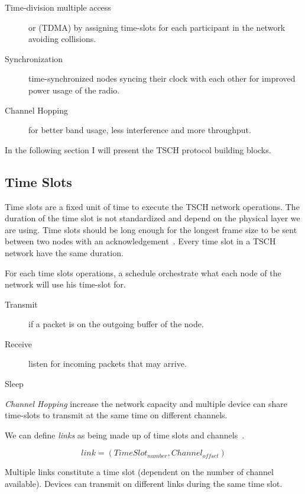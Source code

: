 \begin{description}
  \item[Time-division multiple access] or (TDMA) by assigning time-slots for each
    participant in the network avoiding collisions.
  \item[Synchronization] time-synchronized nodes syncing their clock with each
    other for improved power usage of the radio.
  \item[Channel Hopping] for better band usage, less interference and more
    throughput.
\end{description}

In the following section I will present the TSCH protocol building blocks.

\subsection{Time Slots}

Time slots are a fixed unit of time to execute the TSCH network operations. 
The duration of the time slot is not standardized and depend on the physical 
layer we are using. 
Time slots should be long enough for the longest frame size to be sent
between two nodes with an acknowledgement~\cite{rfc7554}. 
Every time slot in a TSCH network have the same duration.

For each time slots operations, a schedule orchestrate what each
node of the network will use his time-slot for.

\begin{description}
  \item [Transmit] if a packet is on the outgoing buffer of the node.
  \item [Receive] listen for incoming packets that may arrive.
  \item [Sleep]
\end{description}

\emph{Channel Hopping} increase the network capacity and multiple device can
share time-slots to transmit at the same time on different channels.

We can define \emph{links} as being made up of time slots and
channels~\cite{Chen2013PerformanceAO}.

\begin{equation}
  \label{eq:links}
  link = (TimeSlot_{number}, Channel_{offset})
\end{equation}

Multiple links constitute a time slot (dependent on the number of channel
available). Devices can transmit on different links during the same time slot.

